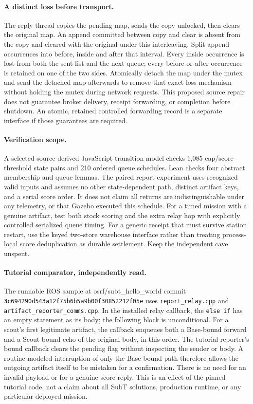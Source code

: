\documentclass[11pt]{article}
\begin{document}
\paragraph{A distinct loss before transport.} The reply thread copies the pending map, sends the copy unlocked, then clears the original map. An append committed between copy and clear is absent from the copy and cleared with the original under this interleaving. Split append occurrences into before, inside and after that interval. Every inside occurrence is lost from both the sent list and the next queue; every before or after occurrence is retained on one of the two sides. Atomically detach the map under the mutex and send the detached map afterwards to remove that exact loss mechanism without holding the mutex during network requests. This proposed source repair does not guarantee broker delivery, receipt forwarding, or completion before shutdown. An atomic, retained controlled forwarding record is a separate interface if those guarantees are required.

\paragraph{Verification scope.} A selected source-derived JavaScript transition model checks 1,085 cap/score-threshold state pairs and 210 ordered queue schedules. Lean checks four abstract membership and queue lemmas. The paired report experiment uses recognized valid inputs and assumes no other state-dependent path, distinct artifact keys, and a serial score order. It does not claim all returns are indistinguishable under any telemetry, or that Gazebo executed this schedule. For a timed mission with a genuine artifact, test both stock scoring and the extra relay hop with explicitly controlled serialized queue timing. For a generic receipt that must survive station restart, use the keyed two-store warehouse interface rather than treating process-local score deduplication as durable settlement. Keep the independent cave unspent.

\paragraph{Tutorial comparator, independently read.}
The runnable ROS sample at osrf/subt\_hello\_world commit
\texttt{3c694290d543a12f75b6b5a9b00f30852212f05e}
uses \texttt{report\_relay.cpp} and \texttt{artifact\_reporter\_comms.cpp}.
In the installed relay callback, the \texttt{else if} has an empty
statement as its body; the following block is unconditional.
For a scout's first legitimate artifact, the callback enqueues both
a Base-bound forward and a Scout-bound echo of the original body,
in this order. The tutorial reporter's bound callback clears the
pending flag without inspecting the sender or body. A routine
modeled interruption of only the Base-bound path therefore allows
the outgoing artifact itself to be mistaken for a confirmation.
There is no need for an invalid payload or for a genuine score reply.
This is an effect of the pinned tutorial code, not a claim about
all SubT solutions, production runtime, or any particular deployed
mission.
\end{document}
